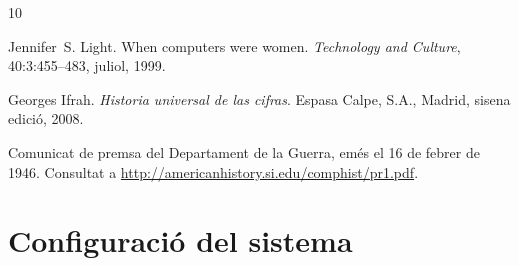 \documentclass[11pt,catalan,listoffigures,listoftables]{tfgetsinf}
\begin{document}

\begin{thebibliography}{10}

   Jennifer~S. Light.
   \newblock When computers were women.
   \newblock \textit{Technology and Culture}, 40:3:455--483, juliol, 1999.

   Georges Ifrah.
   \newblock \textit{Historia universal de las cifras}.
   \newblock Espasa Calpe, S.A., Madrid, sisena edició, 2008.

   Comunicat de premsa del Departament de la Guerra, 
   emés el 16 de febrer de 1946. 
   \newblock Consultat a 
   \url{http://americanhistory.si.edu/comphist/pr1.pdf}.

\end{thebibliography}
\cleardoublepage


\APPENDIX


\chapter{Configuració del sistema}
\end{document}

